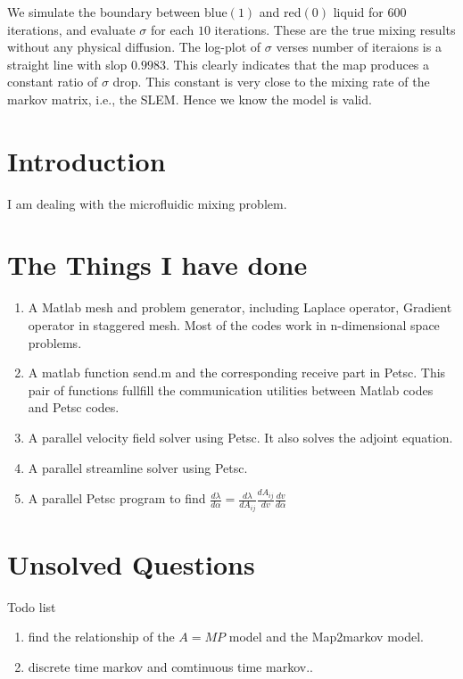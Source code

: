 We simulate the boundary between blue$(1)$ and red$(0)$ liquid for 600 iterations, and evaluate $\sigma$ for each $10$ iterations. These are the true mixing results without any physical diffusion. The log-plot of $\sigma$ verses number of iteraions is a straight line with slop $0.9983$. This clearly indicates that the map produces a constant ratio of $\sigma $ drop. This constant is very close to the mixing rate of the markov matrix, i.e., the SLEM. Hence we know the model is valid.    



\section{Introduction}
I am dealing with the microfluidic mixing problem. 

\section{The Things I have done}
  \begin{enumerate}
\item A Matlab mesh and problem generator, including Laplace operator, Gradient operator in staggered mesh. Most of the codes work in n-dimensional space problems.

\item A matlab function send.m and the corresponding receive part in Petsc. This pair of functions fullfill the communication utilities between Matlab codes and Petsc codes.   

\item A parallel velocity field solver using Petsc. It also solves the adjoint equation.   

\item A parallel streamline solver using Petsc.

\item A parallel Petsc program to find $\frac{d\lambda}{d\alpha} = \frac{d\lambda}{dA_{ij}} \frac{dA_{ij}}{dv} \frac{dv}{d\alpha}$
 
  \end{enumerate}
\section{Unsolved Questions}
Todo list
\begin{enumerate}
 \item find the relationship of the $A = MP$ model and the Map2markov model.
 \item discrete time markov and comtinuous time markov..  
   
 
\end{enumerate}

